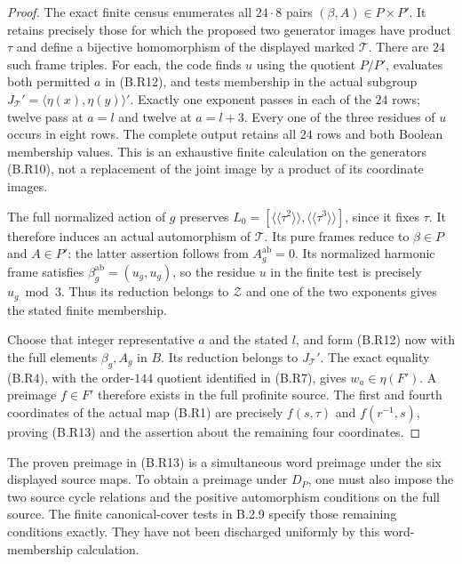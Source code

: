 \begin{proof}
The exact finite census
 enumerates all
$24\cdot8$ pairs $(\beta,A)\in P\times P'$.  It retains
precisely those for which the proposed two generator images
have product $\tau$ and define a bijective homomorphism of
the displayed marked $\mathcal T$.  There are $24$ such
frame triples.  For each, the code finds $u$ using the
quotient $P/P'$, evaluates both permitted $a$ in (B.R12),
and tests membership in the actual subgroup
$J_{\mathcal T}'=\langle\eta(x),\eta(y)\rangle'$.
Exactly one exponent passes in each of the $24$ rows;
twelve pass at $a=l$ and twelve at $a=l+3$.  Every one of
the three residues of $u$ occurs in eight rows.  The
complete output retains all $24$ rows and both Boolean
membership values.  This is an exhaustive finite calculation
on the generators (B.R10), not a replacement of the joint
image by a product of its coordinate images.

The full normalized action of $g$ preserves
$L_0=[\langle\!\langle\tau^2\rangle\!\rangle,
       \langle\!\langle\tau^3\rangle\!\rangle]$,
since it fixes $\tau$.  It therefore induces an actual
automorphism of $\mathcal T$.  Its pure frames reduce to
$\beta\in P$ and $A\in P'$: the latter assertion follows
from $A_g^{\mathrm{ab}}=0$.  Its normalized harmonic frame
satisfies $\beta_g^{\mathrm{ab}}=(u_g,u_g)$, so the
residue $u$ in the finite test is precisely $u_g\bmod3$.
Thus its reduction belongs to $\mathcal Z$ and one of the
two exponents gives the stated finite membership.

Choose that integer representative $a$ and the stated $l$,
and form (B.R12) now with the full elements $\beta_g,A_g$
in $B$.  Its reduction belongs to $J_{\mathcal T}'$.
The exact equality (B.R4), with the order-$144$ quotient
identified in (B.R7), gives
$w_a\in\eta(F')$.  A preimage $f\in F'$ therefore exists
in the full profinite source.  The first and fourth
coordinates of the actual map (B.R1) are precisely
$f(s,\tau)$ and $f(r^{-1},s)$, proving (B.R13) and the
assertion about the remaining four coordinates.
\end{proof}

The proven preimage in (B.R13) is a simultaneous word
preimage under the six displayed source maps.  To obtain a
preimage under $D_P$, one must also impose the two source
cycle relations and the positive automorphism conditions
on the full source.  The finite canonical-cover tests in
B.2.9 specify those remaining conditions exactly.  They
have not been discharged uniformly by this word-membership
calculation.
